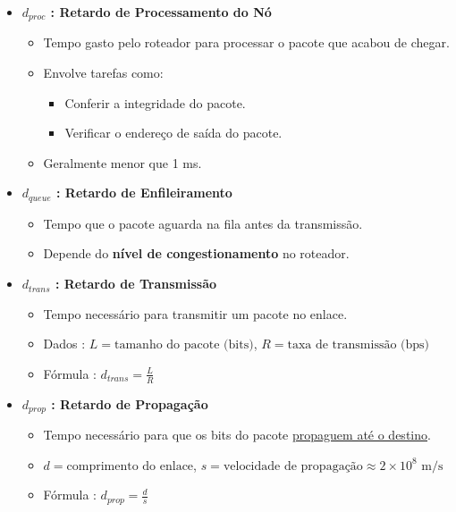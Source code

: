 \begin{itemize}[left=0.5cm, align=left, nosep]
            \begin{itemize}[left=0.5cm, nosep, label=$\hookrightarrow$]
                \item \textbf{$d_{proc}$ : Retardo de Processamento do Nó}
                \begin{itemize}[left=0.5cm, nosep, label=$-$]
                    \item Tempo gasto pelo roteador para processar o pacote que acabou de chegar.
                    \item Envolve tarefas como:
                    \begin{itemize}[left=0.5cm, nosep, label=$\blacktriangleright$]
                        \item Conferir a integridade do pacote.
                        \item Verificar o endereço de saída do pacote.
                    \end{itemize}
                    \item Geralmente menor que 1 ms.
                \end{itemize}
            
                \item \textbf{$d_{queue}$ : Retardo de Enfileiramento} 
                \begin{itemize}[left=0.5cm, nosep, label=$-$]
                    \item Tempo que o pacote aguarda na fila antes da transmissão.
                    \item Depende do \textbf{nível de congestionamento} no roteador.
                \end{itemize}
                
                \item \textbf{$d_{trans}$ : Retardo de Transmissão}
                \begin{itemize}[left=0.5cm, nosep, label=$-$]
                    \item Tempo necessário para transmitir um pacote no enlace.
                    \item Dados : $L = \text{tamanho do pacote (bits)}$, $R = \text{taxa de transmissão (bps)}$
                    \item Fórmula : $\boxed{d_{trans} = \frac{L}{R}}$
                \end{itemize}

                \item \textbf{$d_{prop}$ : Retardo de Propagação}
                \begin{itemize}[left=0.5cm, nosep, label=$-$]
                    \item Tempo necessário para que os bits do pacote \underline{propaguem até o destino}.
                    \item $d = \text{comprimento do enlace}$, $s = \text{velocidade de propagação} \approx 2 \times 10^8 \text{ m/s}$
                    \item Fórmula : $\boxed{d_{prop} = \frac{d}{s}}$
                \end{itemize}
            

\end{itemize}
\end{itemize}
